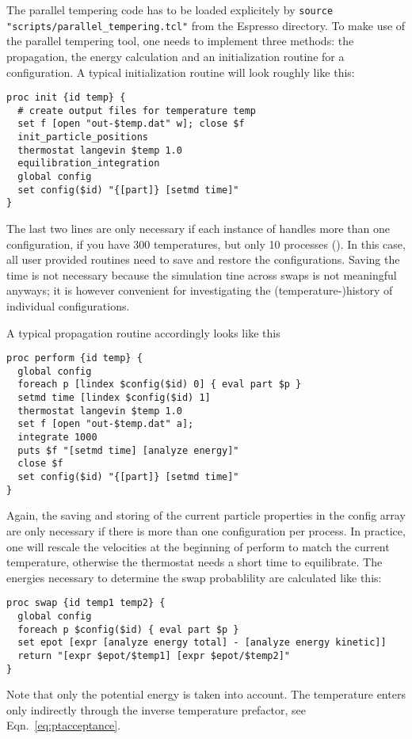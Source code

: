 The parallel tempering code has to be loaded explicitely by {\tt source
  "scripts/parallel_tempering.tcl"} from the Espresso directory. To make use of the parallel
tempering tool, one needs to implement three methods: the propagation, the energy calculation and
an initialization routine for a configuration. A typical initialization routine will look roughly
like this:
\begin{verbatim}
proc init {id temp} {
  # create output files for temperature temp
  set f [open "out-$temp.dat" w]; close $f
  init_particle_positions
  thermostat langevin $temp 1.0
  equilibration_integration
  global config
  set config($id) "{[part]} [setmd time]"
}
\end{verbatim}
The last two lines are only necessary if each instance of \es{} handles more than one
configuration, \eg if you have 300 temperatures, but only 10 \es{} processes
().  In this case, all
user provided routines need to save and restore the configurations. Saving the time is not
necessary because the simulation tine across swaps is not meaningful anyways; it is however
convenient for investigating the (temperature-)history of individual configurations.

A typical propagation routine accordingly looks like this
\begin{verbatim}
proc perform {id temp} {
  global config
  foreach p [lindex $config($id) 0] { eval part $p }
  setmd time [lindex $config($id) 1]
  thermostat langevin $temp 1.0
  set f [open "out-$temp.dat" a];
  integrate 1000
  puts $f "[setmd time] [analyze energy]"
  close $f
  set config($id) "{[part]} [setmd time]"
}
\end{verbatim}
Again, the saving and storing of the current particle properties in the config array are only
necessary if there is more than one configuration per process. In practice, one will rescale the
velocities at the beginning of perform to match the current temperature, otherwise the thermostat
needs a short time to equilibrate. The energies necessary to determine the swap probablility are
calculated like this:
\begin{verbatim}
proc swap {id temp1 temp2} {
  global config
  foreach p $config($id) { eval part $p }
  set epot [expr [analyze energy total] - [analyze energy kinetic]]
  return "[expr $epot/$temp1] [expr $epot/$temp2]"
}
\end{verbatim} %
Note that only the potential energy is taken into account. The temperature enters only indirectly
through the inverse temperature prefactor, see Eqn.~\eqref{eq:ptacceptance}.

